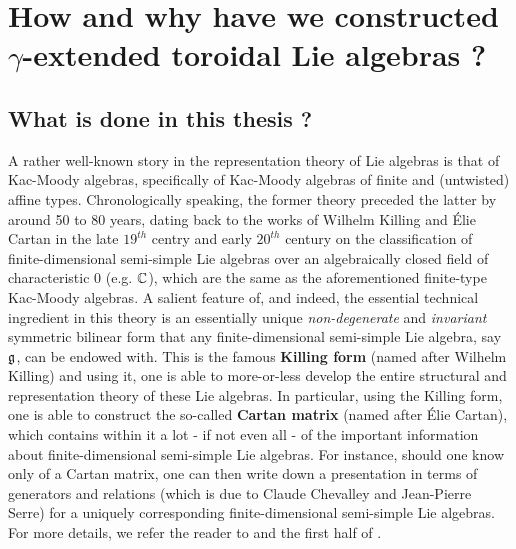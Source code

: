\section{How and why have we constructed \texorpdfstring{$\gamma$}{}-extended toroidal Lie algebras ?}
    \subsection{What is done in this thesis ?}
        A rather well-known story in the representation theory of Lie algebras is that of Kac-Moody algebras, specifically of Kac-Moody algebras of finite and (untwisted) affine types. Chronologically speaking, the former theory preceded the latter by around 50 to 80 years, dating back to the works of Wilhelm Killing and \'Elie Cartan in the late $19^{th}$ centry and early $20^{th}$ century on the classification of finite-dimensional semi-simple Lie algebras over an algebraically closed field of characteristic $0$ (e.g. $\mathbb{C}$), which are the same as the aforementioned finite-type Kac-Moody algebras. A salient feature of, and indeed, the essential technical ingredient in this theory is an essentially unique \textit{non-degenerate} and \textit{invariant} symmetric bilinear form that any finite-dimensional semi-simple Lie algebra, say $\mathfrak{g}$, can be endowed with. This is the famous \textbf{Killing form} (named after Wilhelm Killing) and using it, one is able to more-or-less develop the entire structural and representation theory of these Lie algebras. In particular, using the Killing form, one is able to construct the so-called \textbf{Cartan matrix} (named after \'Elie Cartan), which contains within it a lot - if not even all - of the important information about finite-dimensional semi-simple Lie algebras. For instance, should one know only of a Cartan matrix, one can then write down a presentation in terms of generators and relations (which is due to Claude Chevalley and Jean-Pierre Serre) for a uniquely corresponding finite-dimensional semi-simple Lie algebras. For more details, we refer the reader to \cite{humphreys_lie_algebras} and the first half of \cite{carter_affine_lie_algebras}.

